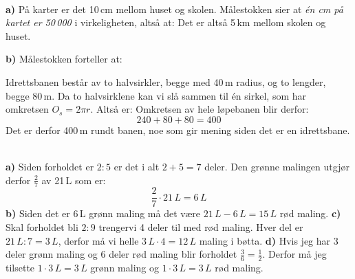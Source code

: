  \\
\textbf{a)} På karter er det 10\,cm mellom huset og skolen. Målestokken sier at \textsl{én cm på kartet er 50\,000} i virkeligheten, altså at:
Det er altså 5\,km mellom skolen og huset.\os

\textbf{b)} Målestokken forteller at:

Idrettsbanen består av to halvsirkler, begge med 40\,m radius, og to lengder, begge 80\,m. Da to halvsirklene kan vi slå sammen til én sirkel, som har omkretsen $O_s= 2\pi r $. Altså er:
Omkretsen av hele løpebanen blir derfor:
\[ 240+80+80=400 \]
Det er derfor 400\,m rundt banen, noe som gir mening siden det er en idrettsbane. \vsk

\\
\textbf{a)} Siden forholdet er $ {2:5} $ er det i alt $ {2+5=7} $ deler. Den grønne malingen utgjør derfor $ \frac{2}{7} $ av 21\,L som er:
\[ \frac{2}{7}\cdot21\,L =6\,L \] 
\textbf{b)} Siden det er 6\,L grønn maling må det være $ 21\,L-6\,L=15\,L $ rød maling.\os
\textbf{c)} Skal forholdet bli $ {2:9} $ trengervi 4 deler til med rød maling. Hver del er $ 21\,L:7=3\,L $, derfor må vi helle $ 3\,L\cdot4=12\,L $ maling i bøtta.\os
\textbf{d)} Hvis jeg har $ 3 $ deler grønn maling og 6 deler rød maling blir forholdet $ \frac{3}{6}=\frac{1}{2} $. Derfor må jeg tilsette $ 1\cdot3\,L=3\,L $ grønn maling og $ 1\cdot3\,L=3\,L $ rød maling. \vsk



